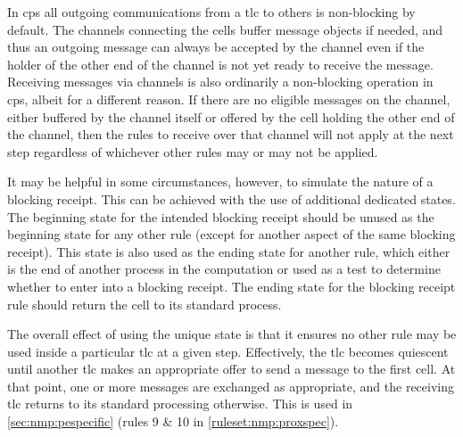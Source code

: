 In \gls{cps} all outgoing communications from a \gls{tlc} to others is non-blocking by default.  The channels connecting the cells buffer message objects if needed, and thus an outgoing message can always be accepted by the channel even if the holder of the other end of the channel is not yet ready to receive the message.  Receiving messages via channels is also ordinarily a non-blocking operation in \gls{cps}, albeit for a different reason.  If there are no eligible messages on the channel, either buffered by the channel itself or offered by the cell holding the other end of the channel, then the rules to receive over that channel will not apply at the next step regardless of whichever other rules may or may not be applied.

It may be helpful in some circumstances, however, to simulate the nature of a blocking receipt.  This can be achieved with the use of additional dedicated states.  The beginning state for the intended blocking receipt should be unused as the beginning state for any other rule (except for another aspect of the same blocking receipt).  This state is also used as the ending state for another rule, which either is the end of another process in the computation or used as a test to determine whether to enter into a blocking receipt.  The ending state for the blocking receipt rule should return the cell to its standard process.

The overall effect of using the unique state is that it ensures no other rule may be used inside a particular \gls{tlc} at a given step.  Effectively, the \gls{tlc} becomes quiescent until another \gls{tlc} makes an appropriate offer to send a message to the first cell.  At that point, one or more messages are exchanged as appropriate, and the receiving \gls{tlc} returns to its standard processing otherwise.  This is used in \cref{sec:nmp:pespecific} (rules 9 \& 10 in \cref{ruleset:nmp:proxspec}).

